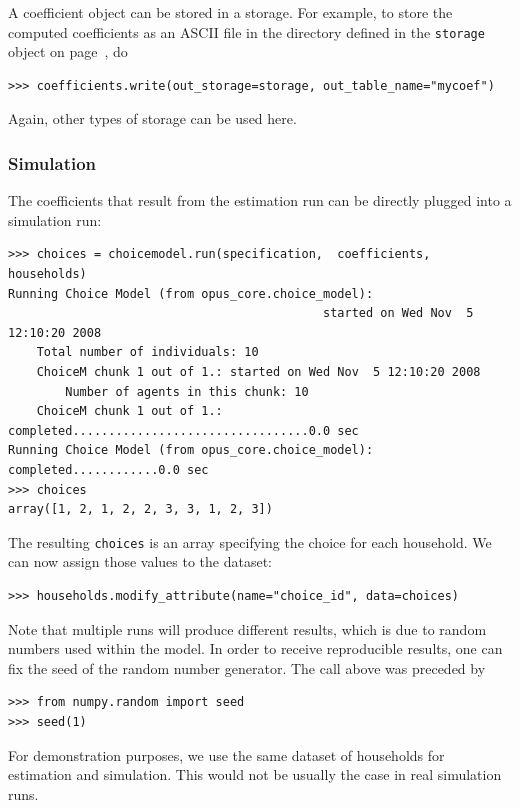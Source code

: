 A coefficient object can
be stored in a storage. For example, to store the computed coefficients as an
ASCII file  in the directory defined in the \verb|storage| object
on page~\pageref{storagepage}, do

\begin{verbatim}
>>> coefficients.write(out_storage=storage, out_table_name="mycoef")
\end{verbatim}
Again, other types of storage can be used here.


\subsubsection{Simulation}
%
The coefficients that result from the estimation run can be directly plugged
into a simulation run:

\begin{verbatim}
>>> choices = choicemodel.run(specification,  coefficients, households)
Running Choice Model (from opus_core.choice_model): 
                                            started on Wed Nov  5 12:10:20 2008
    Total number of individuals: 10
    ChoiceM chunk 1 out of 1.: started on Wed Nov  5 12:10:20 2008
        Number of agents in this chunk: 10
    ChoiceM chunk 1 out of 1.: completed.................................0.0 sec
Running Choice Model (from opus_core.choice_model): completed............0.0 sec
>>> choices
array([1, 2, 1, 2, 2, 3, 3, 1, 2, 3])
\end{verbatim}
The resulting \verb|choices| is an array specifying the choice for each household. We can
now assign those values to the dataset: 
\begin{verbatim}
>>> households.modify_attribute(name="choice_id", data=choices)
\end{verbatim}

Note that multiple runs will produce different results, which is due to random
numbers  used within the model. In order to receive reproducible results, one
can fix the seed of the random number generator. The call above was
preceded by
\begin{verbatim}
>>> from numpy.random import seed
>>> seed(1)
\end{verbatim}

For demonstration purposes, we use the same dataset of households
for estimation and simulation. This would not be usually the case in real
simulation runs.

